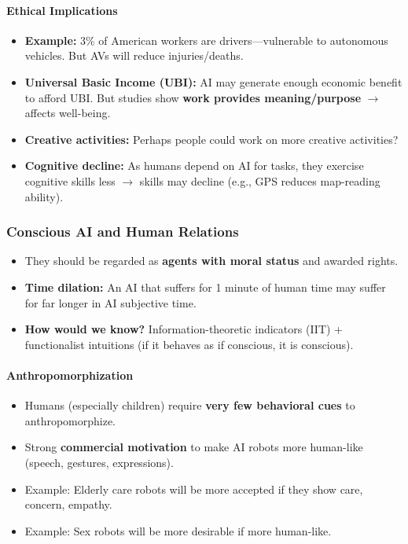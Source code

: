 \paragraph*{Ethical Implications}

\begin{itemize}
  \item \textbf{Example:} 3\% of American workers are drivers---vulnerable to autonomous vehicles. But AVs will reduce injuries/deaths.
  \item \textbf{Universal Basic Income (UBI):} AI may generate enough economic benefit to afford UBI. But studies show \textbf{work provides meaning/purpose} $\to$ affects well-being.
  \item \textbf{Creative activities:} Perhaps people could work on more creative activities?
  \item \textbf{Cognitive decline:} As humans depend on AI for tasks, they exercise cognitive skills less $\to$ skills may decline (e.g., GPS reduces map-reading ability).
\end{itemize}

\bigseparator

\subsubsection{Conscious AI and Human Relations}

\begin{keybox}
\begin{itemize}
  \item They should be regarded as \textbf{agents with moral status} and awarded rights.
  \item \textbf{Time dilation:} An AI that suffers for 1 minute of human time may suffer for far longer in AI subjective time.
  \item \textbf{How would we know?} Information-theoretic indicators (IIT) + functionalist intuitions (if it behaves as if conscious, it is conscious).
\end{itemize}
\end{keybox}

\paragraph*{Anthropomorphization}

\begin{itemize}
  \item Humans (especially children) require \textbf{very few behavioral cues} to anthropomorphize.
  \item Strong \textbf{commercial motivation} to make AI robots more human-like (speech, gestures, expressions).
  \item Example: Elderly care robots will be more accepted if they show care, concern, empathy.
  \item Example: Sex robots will be more desirable if more human-like.
\end{itemize}


